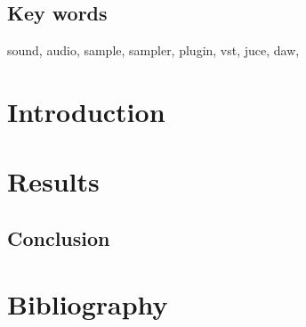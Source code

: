 \documentclass[12pt , a4paper]{article}
\begin{document}
	\subsection{Key words}
		sound, audio, sample, sampler, plugin, vst, juce, daw, 

	
	\newpage
	\section{Introduction}
	
	\newpage
	\section{Results}
	\subsection{Conclusion}
	 
	\newpage
	\section{Bibliography}
	
\end{document}
